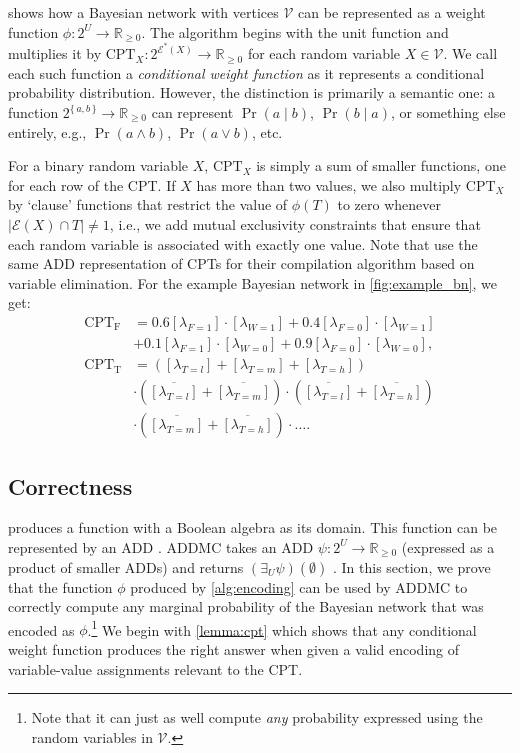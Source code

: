  shows how a Bayesian network with vertices $\mathcal{V}$ can
be represented as a weight function $\phi\colon 2^U \to \mathbb{R}_{\ge 0}$. The
algorithm begins with the unit function and multiplies it by
$\mathrm{CPT}_X\colon 2^{\mathcal{E}^*(X)} \to \mathbb{R}_{\ge 0}$ for each
random variable $X \in \mathcal{V}$. We call each such function a
\emph{conditional weight function} as it represents a conditional probability
distribution. However, the distinction is primarily a semantic one: a function
$2^{\{\, a, b \,\}} \to \mathbb{R}_{\ge 0}$ can represent $\Pr(a \mid b)$,
$\Pr(b \mid a)$, or something else entirely, e.g., $\Pr(a \land b)$,
$\Pr(a \lor b)$, etc.

For a binary random variable $X$, $\mathrm{CPT}_X$ is simply a sum of smaller
functions, one for each row of the CPT\@. If $X$ has more than two values, we
also multiply $\mathrm{CPT}_X$ by `clause' functions that restrict the value of
$\phi(T)$ to zero whenever $|\mathcal{E}(X) \cap T| \ne 1$, i.e., we add mutual
exclusivity constraints that ensure that each random variable is associated with
exactly one value. Note that \citet{DBLP:conf/ijcai/ChaviraD07} use the same ADD
representation of CPTs for their compilation algorithm based on variable
elimination. For the example Bayesian network in \cref{fig:example_bn}, we get:
\begin{align*}
  \mathrm{CPT_F} &= 0.6[\lambda_{F=1}] \cdot [\lambda_{W=1}] + 0.4[\lambda_{F=0}] \cdot [\lambda_{W=1}] \\
                 &+ 0.1[\lambda_{F=1}] \cdot [\lambda_{W=0}] + 0.9[\lambda_{F=0}] \cdot [\lambda_{W=0}], \\
  \mathrm{CPT_T} &= ([\lambda_{T=l}] + [\lambda_{T=m}] + [\lambda_{T=h}]) \\
                 &\cdot (\overline{[\lambda_{T=l}]} + \overline{[\lambda_{T=m}]}) \cdot (\overline{[\lambda_{T=l}]} + \overline{[\lambda_{T=h}]}) \\
                 &\cdot (\overline{[\lambda_{T=m}]} + \overline{[\lambda_{T=h}]}) \cdot \dots.
\end{align*}

\subsection{Correctness}

 produces a function with a Boolean algebra as its domain.
This function can be represented by an ADD
\citep{DBLP:journals/fmsd/BaharFGHMPS97}. \textsc{ADDMC} takes an ADD
$\psi\colon 2^{U} \to \mathbb{R}_{\ge 0}$ (expressed as a product of smaller
ADDs) and returns $(\exists_U\psi)(\emptyset)$ \citep{DBLP:conf/aaai/DudekPV20}.
In this section, we prove that the function $\phi$ produced by
\cref{alg:encoding} can be used by \textsc{ADDMC} to correctly compute any
marginal probability of the Bayesian network that was encoded as
$\phi$.\footnote{Note that it can just as well compute \emph{any} probability
  expressed using the random variables in $\mathcal{V}$.} We begin with
\cref{lemma:cpt} which shows that any conditional weight function produces the
right answer when given a valid encoding of variable-value assignments relevant
to the CPT\@.

